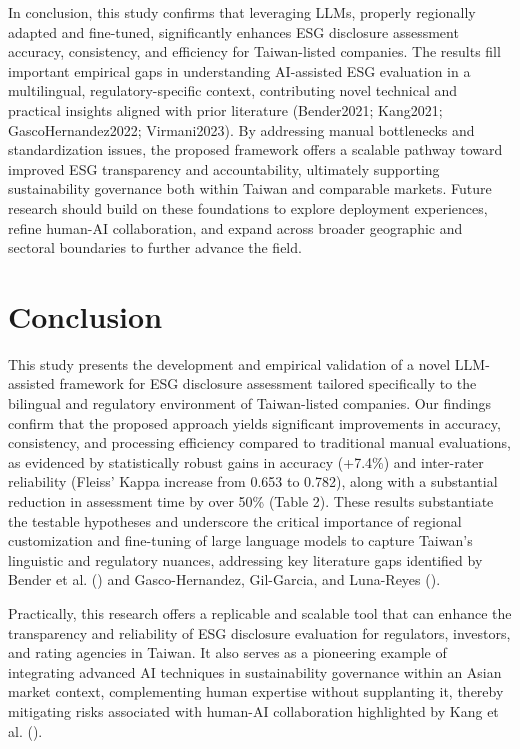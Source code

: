 \documentclass[
  12pt,
]{article}
\begin{document}
In conclusion, this study confirms that leveraging LLMs, properly
regionally adapted and fine-tuned, significantly enhances ESG disclosure
assessment accuracy, consistency, and efficiency for Taiwan-listed
companies. The results fill important empirical gaps in understanding
AI-assisted ESG evaluation in a multilingual, regulatory-specific
context, contributing novel technical and practical insights aligned
with prior literature (Bender2021; Kang2021; GascoHernandez2022;
Virmani2023). By addressing manual bottlenecks and standardization
issues, the proposed framework offers a scalable pathway toward improved
ESG transparency and accountability, ultimately supporting
sustainability governance both within Taiwan and comparable markets.
Future research should build on these foundations to explore deployment
experiences, refine human-AI collaboration, and expand across broader
geographic and sectoral boundaries to further advance the field.

\section{Conclusion}\label{conclusion}

This study presents the development and empirical validation of a novel
LLM-assisted framework for ESG disclosure assessment tailored
specifically to the bilingual and regulatory environment of
Taiwan-listed companies. Our findings confirm that the proposed approach
yields significant improvements in accuracy, consistency, and processing
efficiency compared to traditional manual evaluations, as evidenced by
statistically robust gains in accuracy (+7.4\%) and inter-rater
reliability (Fleiss' Kappa increase from 0.653 to 0.782), along with a
substantial reduction in assessment time by over 50\% (Table 2). These
results substantiate the testable hypotheses and underscore the critical
importance of regional customization and fine-tuning of large language
models to capture Taiwan's linguistic and regulatory nuances, addressing
key literature gaps identified by Bender et al.
() and Gasco-Hernandez, Gil-Garcia, and
Luna-Reyes ().

Practically, this research offers a replicable and scalable tool that
can enhance the transparency and reliability of ESG disclosure
evaluation for regulators, investors, and rating agencies in Taiwan. It
also serves as a pioneering example of integrating advanced AI
techniques in sustainability governance within an Asian market context,
complementing human expertise without supplanting it, thereby mitigating
risks associated with human-AI collaboration highlighted by Kang et al.
().
\end{document}
